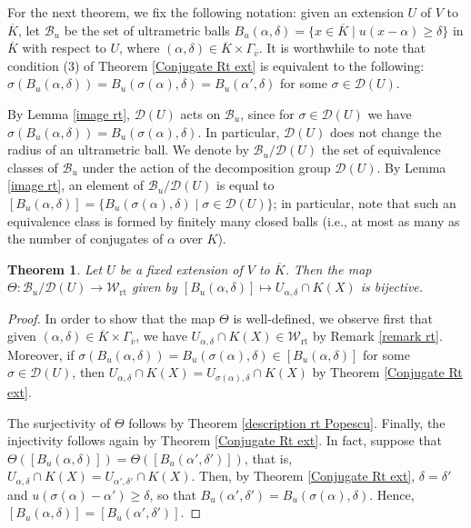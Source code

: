 \documentclass[10pt]{article}
\numberwithin{equation}{section}
\newtheorem{Thm}[equation]{Theorem}
\theoremstyle{definition}
\theoremstyle{definition}
\newcommand{\Q}{\mathbb{Q}}
\newcommand{\rt}{\text{rt}}
\newcommand\rc { \color{red}}
\begin{document}
For the next theorem, we fix the following notation: given an extension $U$ of  $V$ to $\overline{K}$, let $\mathcal{B}_u$ be the set of ultrametric balls $B_u(\alpha,\delta)=\{x\in\overline{K}\mid u(x-\alpha)\geq\delta\}$ in $\overline K$ with respect to $U$, where $(\alpha,\delta)\in \overline{K}\times\Gamma_{\overline{v}}$.
 It is worthwhile to note that condition (3) of Theorem \ref{Conjugate Rt ext} is equivalent to the following: 
$\sigma(B_u(\alpha,\delta))=B_u(\sigma(\alpha),\delta)=B_u(\alpha',\delta)$ for some $\sigma\in \mathcal{D}(U)$.

By Lemma \ref{image rt}, $\mathcal{D}(U)$ acts on $\mathcal{B}_u$, since for $\sigma\in \mathcal{D}(U)$ we have $\sigma(B_u(\alpha,\delta))=B_u(\sigma(\alpha),\delta)$. 
In particular, $\mathcal{D}(U)$ does not change the radius of an ultrametric ball.
We denote by $\mathcal{B}_u/\mathcal{D}(U)$ the set of equivalence classes of $\mathcal{B}_u$ under the action of the decomposition group $\mathcal{D}(U)$. 
By Lemma \ref{image rt}, an element of $\mathcal{B}_u/\mathcal{D}(U)$ is equal to $[B_u(\alpha,\delta)]=\{B_u(\sigma(\alpha),\delta)\mid\sigma\in\mathcal{D}(U)\}$; 
in particular, note that such an equivalence class is formed by finitely many closed balls (i.e., at most as many as the number of conjugates of $\alpha$ over $K$).

 

 
 

\begin{Thm}\label{parametrization rt}
Let $U$ be a fixed extension of $V$ to $\overline{K}$. Then the map
$\Theta:\mathcal{B}_u/\mathcal{D}(U) \to \mathcal W_{\rt}$ given by 
$[B_u(\alpha,\delta)] \mapsto U_{\alpha,\delta}\cap K(X)$ is bijective. 
\end{Thm}
\begin{proof}
In order to show that the map $\Theta$ is well-defined, we observe first that given $(\alpha,\delta)\in \overline{K}\times\Gamma_{\overline{v}}$, we have  $U_{\alpha,\delta}\cap K(X)\in \mathcal W_{\rt}$ by Remark \ref{remark rt}. Moreover, if $\sigma(B_u(\alpha,\delta))=B_u(\sigma(\alpha),\delta)\in [B_u(\alpha,\delta)]$ for some $\sigma\in \mathcal{D}(U)$, then $U_{\alpha,\delta}\cap K(X)=U_{\sigma(\alpha),\delta}\cap K(X)$ by Theorem \ref{Conjugate Rt ext}.

The surjectivity of $\Theta$ follows by Theorem \ref{description rt Popescu}.
Finally, the injectivity follows again by Theorem \ref{Conjugate Rt ext}. In fact, suppose that $\Theta([B_u(\alpha,\delta)])=\Theta([B_u(\alpha',\delta')])$, that is, $U_{\alpha,\delta}\cap K(X)=U_{\alpha',\delta'}\cap K(X)$. Then, by Theorem \ref{Conjugate Rt ext}, $\delta=\delta'$ and $u(\sigma(\alpha)-\alpha')\geq\delta$, so that $B_u(\alpha',\delta')=B_u(\sigma(\alpha),\delta)$. Hence, $[B_u(\alpha,\delta)]=[B_u(\alpha',\delta')]$.
\end{proof}
\end{document}
